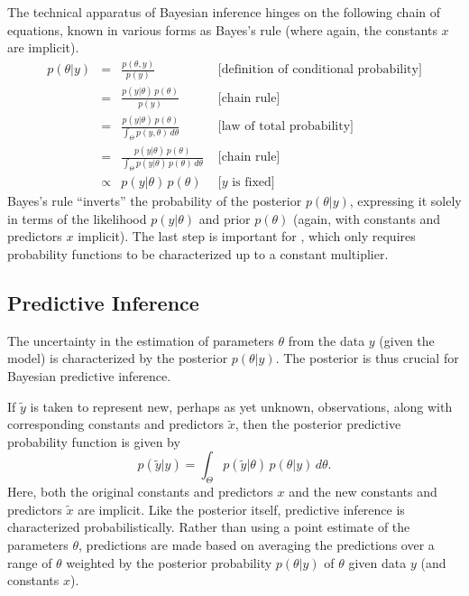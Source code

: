 The technical apparatus of Bayesian inference hinges on the following
chain of equations, known in various forms as Bayes's rule (where
again, the constants $x$ are implicit).
%
\[
\begin{array}{rcll}
p(\theta|y)  & =  & \displaystyle \frac{p(\theta,y)}{p(y)}
& \mbox{{} \ \ \ \ \ [definition of  conditional probability]}
\\[16pt]
& = & \displaystyle \frac{p(y|\theta) \, p(\theta)}{p(y)}
& \mbox{{} \ \ \ \ \ [chain rule]}
\\[16pt]
& = & \displaystyle \frac{p(y|\theta) \, p(\theta)}
                        {\int_{\Theta} p(y,\theta) \, d\theta}
& \mbox{{} \ \ \ \ \ [law of total probability]}
\\[16pt]
& = & \displaystyle \frac{p(y|\theta) \, p(\theta)}
                        {\int_{\Theta} p(y|\theta) \, p(\theta) \, d\theta}
& \mbox{{} \ \ \ \ \ [chain rule]}
\\[16pt]
& \propto & \displaystyle p(y|\theta) \, p(\theta)
& \mbox{{} \ \ \ \ \ [$y$ is fixed]}
\end{array}
\]
%
Bayes's rule ``inverts'' the probability of the posterior
$p(\theta|y)$, expressing it solely in terms of the likelihood
$p(y|\theta)$ and prior $p(\theta)$ (again, with constants and
predictors $x$ implicit).  The last step is important for \Stan, which
only requires probability functions to be characterized up to a
constant multiplier.

\subsection{Predictive Inference}

The uncertainty in the estimation of parameters $\theta$ from the data
$y$ (given the model) is characterized by the posterior $p(\theta|y)$.
The posterior is thus crucial for Bayesian predictive inference.

If $\tilde{y}$ is taken to represent new, perhaps as yet unknown,
observations, along with corresponding constants and predictors
$\tilde{x}$, then the posterior predictive probability function is
given by
%
\[
p(\tilde{y}|y)
= \int_{\Theta} p(\tilde{y}|\theta)
                \, p(\theta|y) \, d\theta.
\]
Here, both the original constants and predictors $x$ and the new
constants and predictors $\tilde{x}$ are implicit.  Like the posterior
itself, predictive inference is characterized probabilistically.
Rather than using a point estimate of the parameters $\theta$,
predictions are made based on averaging the predictions over a range
of $\theta$ weighted by the posterior probability $p(\theta|y)$ of
$\theta$ given data $y$ (and constants $x$).

